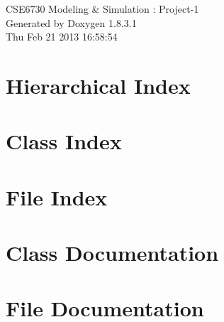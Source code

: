 \documentclass{book}
\begin{document}
\hypersetup{pageanchor=false,citecolor=blue}
\begin{titlepage}
\vspace*{7cm}
\begin{center}
{\Large C\-S\-E6730 Modeling \& Simulation \-: Project-\/1 }\\
\vspace*{1cm}
{\large Generated by Doxygen 1.8.3.1}\\
\vspace*{0.5cm}
{\small Thu Feb 21 2013 16:58:54}\\
\end{center}
\end{titlepage}
\clearemptydoublepage
{}
\tableofcontents
\clearemptydoublepage
{}
\hypersetup{pageanchor=true,citecolor=blue}
\chapter{Hierarchical Index}

\chapter{Class Index}

\chapter{File Index}

\chapter{Class Documentation}




















\chapter{File Documentation}
















\printindex
\end{document}
